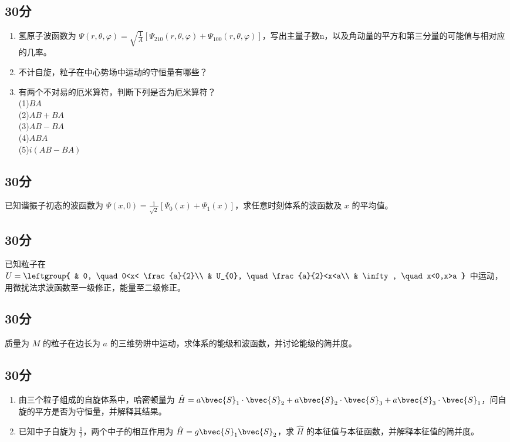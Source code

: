 
\subsection{30分}
\begin{enumerate}
\item 氢原子波函数为 $\displaystyle \varPsi (r,\theta,\varphi)=\sqrt{\frac{1}{A}}[\varPsi_{210}(r,\theta,\varphi)+\varPsi_{100}(r,\theta,\varphi)]$，写出主量子数n，以及角动量的平方和第三分量的可能值与相对应的几率。
\item 不计自旋，粒子在中心势场中运动的守恒量有哪些？
\item 有两个不对易的厄米算符，判断下列是否为厄米算符？\\
(1)$BA$\\(2)$AB+BA$\\(3)$AB-BA$\\(4)$ABA$\\(5)$i(AB-BA)$
\end{enumerate}
\subsection{30分}
已知谐振子初态的波函数为 $\displaystyle \varPsi(x,0)=\frac{1}{\sqrt{2}}[\varPsi_{0}(x)+\varPsi_{1}(x)]$，求任意时刻体系的波函数及 $x$ 的平均值。
\subsection{30分}
已知粒子在 $U=\leftgroup{
    & 0, \quad 0<x< \frac{a}{2}\\
    & U_{0}, \quad \frac{a}{2}<x<a\\
    & \infty, \quad x<0,x>a
}$ 中运动，用微扰法求波函数至一级修正，能量至二级修正。
\subsection{30分}
质量为 $M$ 的粒子在边长为 $a$ 的三维势阱中运动，求体系的能级和波函数，并讨论能级的简并度。
\subsection{30分}
\begin{enumerate}
\item 由三个粒子组成的自旋体系中，哈密顿量为 $\hat {H}=a\bvec{S}_1\cdot\bvec{S}_2+a\bvec{S}_2\cdot\bvec{S}_3+a\bvec{S}_3\cdot\bvec{S}_1$，问自旋的平方是否为守恒量，并解释其结果。
\item 已知中子自旋为 $\frac{1}{2}$，两个中子的相互作用为 $\hat {H}=g\bvec{S}_1\bvec{S}_2$，求 $\hat {H}$ 的本征值与本征函数，并解释本征值的简并度。
\end{enumerate}
